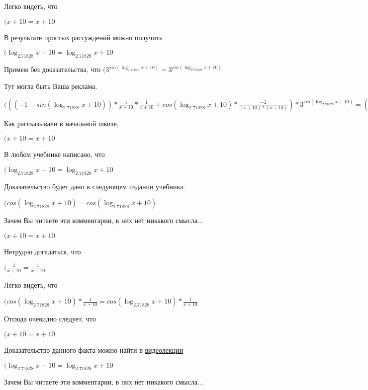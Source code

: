 \documentclass[12pt,a4paper,fleqn]{article}
\theoremstyle{definition}
\begin{document}
Легко видеть, что

$( x  +  10  =  x  +  10 $

В результате простых рассуждений можно получить

$(\log_{ 2.71828 }{ x  +  10 } = \log_{ 2.71828 }{ x  +  10 }$

Примем без доказательства, что
$({ 3 }^{sin(\log_{ 2.71828 }{ x  +  10 })} = { 3 }^{sin(\log_{ 2.71828 }{ x  +  10 })}$

Тут могла быть Ваша реклама.

$((( -1  - sin(\log_{ 2.71828 }{ x  +  10 })) * \frac{ 1 }{ x  +  10 }
 * \frac{ 1 }{ x  +  10 }
 + cos(\log_{ 2.71828 }{ x  +  10 }) * \frac{ -2 }{( x  +  10 ) * ( x  +  10 )}
) * { 3 }^{sin(\log_{ 2.71828 }{ x  +  10 })} = (( -1  - sin(\log_{ 2.71828 }{ x  +  10 })) * \frac{ 1 }{ x  +  10 }
 * \frac{ 1 }{ x  +  10 }
 + cos(\log_{ 2.71828 }{ x  +  10 }) * \frac{ -2 }{( x  +  10 ) * ( x  +  10 )}
) * { 3 }^{sin(\log_{ 2.71828 }{ x  +  10 })}$

Как рассказывали в начальной школе,

$( x  +  10  =  x  +  10 $

В любом учебнике написано, что

$(\log_{ 2.71828 }{ x  +  10 } = \log_{ 2.71828 }{ x  +  10 }$

Доказательство будет дано в следующем издании учебника.

$(cos(\log_{ 2.71828 }{ x  +  10 }) = cos(\log_{ 2.71828 }{ x  +  10 })$

Зачем Вы читаете эти комментарии, в них нет никакого смысла...

$( x  +  10  =  x  +  10 $

Нетрудно догадаться, что

$(\frac{ 1 }{ x  +  10 }
 = \frac{ 1 }{ x  +  10 }
$

Легко видеть, что

$(cos(\log_{ 2.71828 }{ x  +  10 }) * \frac{ 1 }{ x  +  10 }
 = cos(\log_{ 2.71828 }{ x  +  10 }) * \frac{ 1 }{ x  +  10 }
$

Отсюда очевидно следует, что

$( x  +  10  =  x  +  10 $

Доказательство данного факта можно найти в \href{https://www.youtube.com/watch?v=dQw4w9WgXcQ}{видеолекции}

$(\log_{ 2.71828 }{ x  +  10 } = \log_{ 2.71828 }{ x  +  10 }$

Зачем Вы читаете эти комментарии, в них нет никакого смысла...
\end{document}
